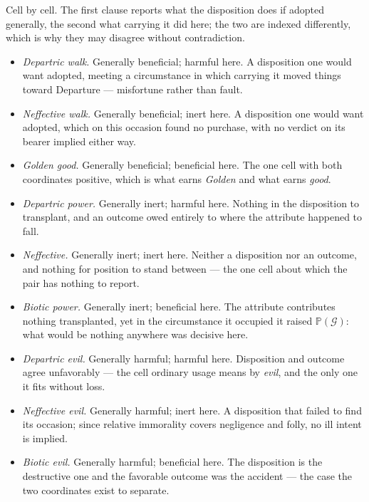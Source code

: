 \documentclass[11pt]{article}
\numberwithin{equation}{section}
\theoremstyle{plain}
\theoremstyle{definition}
\theoremstyle{remark}
\newcommand{\PP}{\mathbb{P}}
\begin{document}
\noindent Cell by cell. The first clause reports what the disposition
does if adopted generally, the second what carrying it did here; the two
are indexed differently, which is why they may disagree without
contradiction.

\begin{itemize}\setlength\itemsep{1.5pt}
\item \emph{Departric walk.} Generally beneficial; harmful here. A
disposition one would want adopted, meeting a circumstance in which
carrying it moved things toward Departure --- misfortune rather than
fault.

\item \emph{Neffective walk.} Generally beneficial; inert here. A
disposition one would want adopted, which on this occasion found no
purchase, with no verdict on its bearer implied either way.

\item \emph{Golden good.} Generally beneficial; beneficial here. The one
cell with both coordinates positive, which is what earns \emph{Golden}
and what earns \emph{good}.

\item \emph{Departric power.} Generally inert; harmful here. Nothing in
the disposition to transplant, and an outcome owed entirely to where the
attribute happened to fall.

\item \emph{Neffective.} Generally inert; inert here. Neither a
disposition nor an outcome, and nothing for position to stand between ---
the one cell about which the pair has nothing to report.

\item \emph{Biotic power.} Generally inert; beneficial here. The
attribute contributes nothing transplanted, yet in the circumstance it
occupied it raised $\PP(\mathcal G)$: what would be nothing anywhere was
decisive here.

\item \emph{Departric evil.} Generally harmful; harmful here.
Disposition and outcome agree unfavorably --- the cell ordinary usage
means by \emph{evil}, and the only one it fits without loss.

\item \emph{Neffective evil.} Generally harmful; inert here. A
disposition that failed to find its occasion; since relative immorality
covers negligence and folly, no ill intent is implied.

\item \emph{Biotic evil.} Generally harmful; beneficial here. The
disposition is the destructive one and the favorable outcome was the
accident --- the case the two coordinates exist to separate.
\end{itemize}
\end{document}
